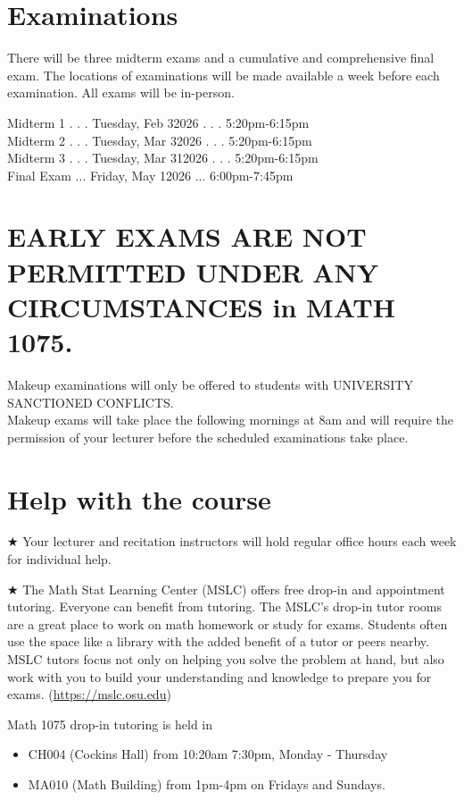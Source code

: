\documentclass{ximera}
\begin{document}
\section*{Examinations}
There will be three midterm exams and a cumulative and comprehensive final exam. The locations of examinations will be made available a week before each examination. All exams will be in-person.

Midterm 1 . . . Tuesday, Feb 32026 . . . 5:20pm-6:15pm\\
Midterm 2 . . . Tuesday, Mar 32026 . . . 5:20pm-6:15pm\\
Midterm 3 . . . Tuesday, Mar 312026 . . . 5:20pm-6:15pm\\
Final Exam ... Friday, May 12026 ... 6:00pm-7:45pm

\section*{EARLY EXAMS ARE NOT PERMITTED UNDER ANY CIRCUMSTANCES in MATH 1075.}
Makeup examinations will only be offered to students with UNIVERSITY SANCTIONED CONFLICTS.\\
Makeup exams will take place the following mornings at 8am and will require the permission of your lecturer before the scheduled examinations take place.

\section*{Help with the course}
★ Your lecturer and recitation instructors will hold regular office hours each week for individual help.

★ The Math Stat Learning Center (MSLC) offers free drop-in and appointment tutoring. Everyone can benefit from tutoring. The MSLC's drop-in tutor rooms are a great place to work on math homework or study for exams. Students often use the space like a library with the added benefit of a tutor or peers nearby. MSLC tutors focus not only on helping you solve the problem at hand, but also work with you to build your understanding and knowledge to prepare you for exams. (\href{https://mslc.osu.edu}{https://mslc.osu.edu})

Math 1075 drop-in tutoring is held in

\begin{itemize}
  \item CH004 (Cockins Hall) from 10:20am 7:30pm, Monday - Thursday
  \item MA010 (Math Building) from 1pm-4pm on Fridays and Sundays.
\end{itemize}
\end{document}
